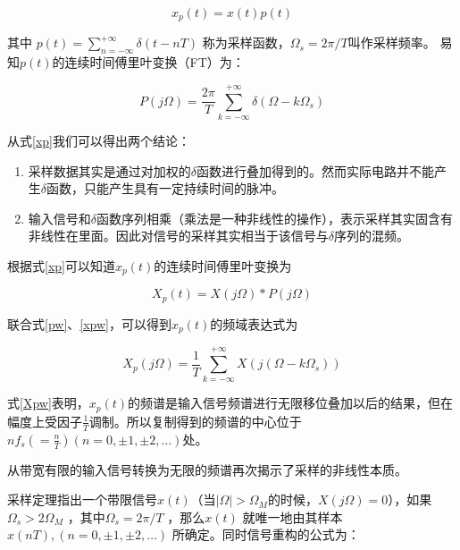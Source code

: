 		\begin {equation}
			{x_p}(t) = x(t)p(t) \label{xp}
		\end {equation}
		
	其中
		$p(t) = \sum\limits_{n =  - \infty }^{ + \infty } {\delta (t - nT)} $
		称为采样函数，${\Omega _s} = 2\pi /T$叫作采样频率。
	易知$p(t)$的连续时间傅里叶变换（FT）为：
		
		\begin{equation}
			P(j\Omega ) = \frac{{2\pi }}{T}\sum\limits_{k =  - \infty }^{ + \infty } {\delta (\Omega  - k{\Omega _s})} \label{pw}
		\end{equation}
	
	
	从式\ref{xp}我们可以得出两个结论：
	
		\begin{enumerate}
			\item	采样数据其实是通过对加权的$\delta $函数进行叠加得到的。然而实际电路并不能产生$\delta $函数，只能产生具有一定持续时间的脉冲。
			\item 输入信号和$\delta $函数序列相乘（乘法是一种非线性的操作），表示采样其实固含有非线性在里面。因此对信号的采样其实相当于该信号与$\delta $序列的混频。
		\end{enumerate}
		
	
	根据式\ref{xp}可以知道${x_p}(t)$的连续时间傅里叶变换为
	
		\begin {equation}
			{X_p}\left( t \right) = X\left( {j\Omega } \right)*P\left( {j\Omega } \right) \label {xpw}
		\end{equation}
		
	联合式\ref{pw}、\ref{xpw}，可以得到${x_p}(t)$的频域表达式为
	
		\begin{equation}
			{X_p}(j\Omega ) = \frac{1}{T}\sum\limits_{k =  - \infty }^{ + \infty } {X(j(\Omega  - k{\Omega _s}))} \label{Xpw}
		\end{equation}
		
	式\ref{Xpw}表明，${x_p}(t)$的频谱是输入信号频谱进行无限移位叠加以后的结果，但在幅度上受因子$\frac{1}{T}$调制。所以复制得到的频谱的中心位于$nf_s(=\frac{n}{T})(n = 0, \pm 1, \pm 2, \ldots )$处。\par	
	从带宽有限的输入信号转换为无限的频谱再次揭示了采样的非线性本质。\par
	采样定理指出一个带限信号$x(t)$（当$\left| \Omega  \right| > {\Omega _M}$的时候，$X(j\Omega ) = 0$），如果${\Omega _s} > 2{\Omega _M}$ ，其中${\Omega _s} = 2\pi /T$ ，那么$x(t)$ 就唯一地由其样本$x(nT),(n=0, \pm 1 , \pm 2 , \ldots )$  所确定。同时信号重构的公式为：
	
